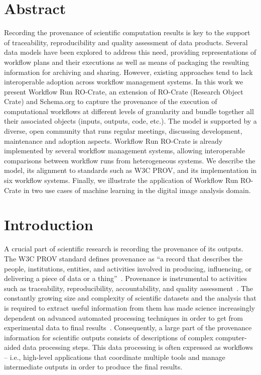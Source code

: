 \documentclass[10pt,letterpaper]{article}
\begin{document}
\section*{Abstract}
Recording the provenance of scientific computation results is key to the support of traceability, reproducibility and quality assessment of data products.
Several data models have been explored to address this need, providing representations of workflow plans and their executions as well as means of packaging the resulting information for archiving and sharing.
However, existing approaches tend to lack interoperable adoption across workflow management systems.
In this work we present Workflow Run RO-Crate, an extension of RO-Crate (Research Object Crate) and Schema.org to capture the provenance of the execution of computational workflows at different levels of granularity and bundle together all their associated objects (inputs, outputs, code, etc.).
The model is supported by a diverse, open community that runs regular meetings, discussing development, maintenance and adoption aspects.
Workflow Run RO-Crate is already implemented by several workflow management systems, allowing interoperable comparisons between workflow runs from heterogeneous systems.
We describe the model, its alignment to standards such as W3C PROV, and its implementation in six workflow systems.
Finally, we illustrate the application of Workflow Run RO-Crate in two use cases of machine learning in the digital image analysis domain.


\linenumbers




\section{Introduction}\label{introduction}

A crucial part of scientific research is recording the provenance of its outputs.
The W3C PROV standard defines provenance as ``a record that describes the people, institutions, entities, and activities involved in producing, influencing, or delivering a piece of data or a thing''~\cite{Moreau 2013}.
Provenance is instrumental to activities such as traceability, reproducibility,
accountability, and quality assessment~\cite{Herschel 2017}.
The constantly growing size and complexity of scientific datasets and the analysis that is required to extract useful information from them has made science increasingly dependent on advanced automated processing techniques in order to get from experimental data to final results~\cite{Himanen 2019, Gauthier 2019, Huntingford 2019}.
Consequently, a large part of the provenance information for scientific outputs consists of descriptions of complex computer-aided data processing steps. This data processing is often expressed as workflows -- i.e., high-level applications that coordinate multiple tools and manage intermediate outputs in order to produce the final results.
\end{document}
